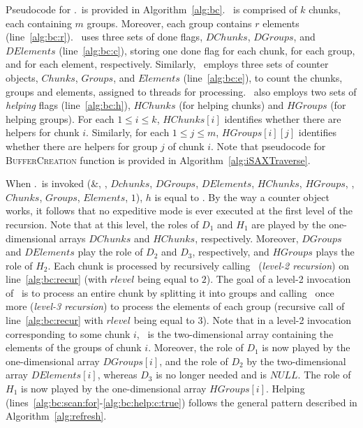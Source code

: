 Pseudocode for \BC.\Traverse\ is provided in Algorithm~\ref{alg:bc}. 
\RawData\ is comprised of $k$ chunks, each containing $m$ groups. Moreover, each group
contains $r$ elements (line~\ref{alg:bc:r}). 
\Fresh\ uses three sets of done flags, $\mathit{DChunks}$, $\mathit{DGroups}$,
and $\mathit{DElements}$ (line~\ref{alg:bc:c}), storing one done flag for each chunk,
for each group, and for each element, respectively.
% 
Similarly, \Fresh\ employs three sets of counter objects, $\mathit{Chunks}$, $\mathit{Groups}$,
and $\mathit{Elements}$ (line~\ref{alg:bc:e}), to count the chunks, groups and elements, assigned
to threads for processing. 
%
\Fresh\ also employs two sets of {\em helping} flags (line~\ref{alg:bc:h}), 
$\mathit{HChunks}$  (for helping chunks) and $\mathit{HGroups}$ (for helping groups). 
For each $1 \leq i \leq k$, $\mathit{HChunks[i]}$ identifies whether there are helpers for chunk $i$.
Similarly, for each $1 \leq j \leq m$, $\mathit{HGroups[i][j]}$ identifies whether there are helpers
for group $j$ of chunk $i$. Note that pseudocode for \textsc{BufferCreation} function is provided in 
Algorithm~\ref{alg:iSAXTraverse}.

When \BC.\Traverse\ is invoked \Traverse(\&\BufferCreation, \RawData, $\mathit{Dchunks}$, $\mathit{DGroups}$, $\mathit{DElements}$,
$\mathit{HChunks}$, $\mathit{HGroups}$, \False, $\mathit{Chunks}$, $\mathit{Groups}$, $\mathit{Elements}$, $1$),
$h$ is equal to \False. By the way a counter object works, it follows that 
no expeditive mode is ever executed at the first level of the recursion.
Note that at this level, the roles of $D_1$ and $H_1$ are played by the one-dimensional arrays
$DChunks$ and $HChunks$, respectively. Moreover, $DGroups$ and $DElements$ play the role of $D_2$ and $D_3$,
respectively, and $HGroups$ plays the role of $H_2$. Each chunk is processed by recursively calling
\Traverse\ ({\em level-2 recursion}) on line~\ref{alg:bc:recur} (with $\mathit{rlevel}$ being equal to $2$). 
The goal of a level-2 invocation of \Traverse\
is to process an entire chunk by splitting it into groups and calling
\Traverse\ once more ({\em level-3 recursion}) to process the elements of each group 
(recursive call of line~\ref{alg:bc:recur} with $\mathit{rlevel}$ being equal to $3$). 
Note that in a level-2 invocation corresponding to some chunk $i$, 
\RawData\ is the two-dimensional array containing the elements of the groups of chunk $i$.
Moreover, the role of $D_1$ is now played by the one-dimensional array $DGroups[i]$, 
and the role of $D_2$ by the two-dimensional array $DElements[i]$,
whereas $D_3$ is no longer needed and is $\mathit{NULL}$.
The role of $H_1$ is now played by the one-dimensional array $HGroups[i]$. 
Helping (lines~\ref{alg:bc:scan:for}-\ref{alg:bc:help:c:true}) follows the general pattern
described in Algorithm~\ref{alg:refresh}. 


